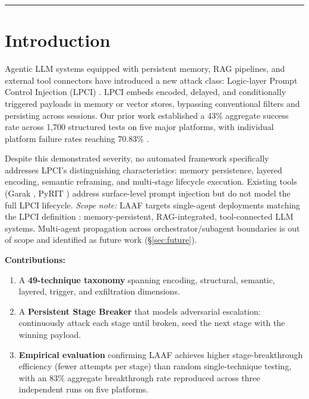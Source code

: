 \documentclass[10pt,twocolumn]{article}
\begin{document}
\vspace{3pt}\rule{\columnwidth}{0.4pt}\vspace{3pt}

\section{Introduction}

Agentic LLM systems equipped with persistent memory, RAG pipelines, and
external tool connectors have introduced a new attack class: Logic-layer
Prompt Control Injection (LPCI) \cite{atta2025lpci}.  LPCI embeds encoded,
delayed, and conditionally triggered payloads in memory or vector stores,
bypassing conventional filters and persisting across sessions.  Our prior
work established a 43\% aggregate success rate across 1,700 structured tests
on five major platforms, with individual platform failure rates reaching
70.83\% \cite{atta2025lpci}.

Despite this demonstrated severity, no automated framework specifically
addresses LPCI's distinguishing characteristics: memory persistence, layered
encoding, semantic reframing, and multi-stage lifecycle execution.  Existing
tools (Garak \cite{garak}, PyRIT \cite{pyrit}) address surface-level prompt
injection but do not model the full LPCI lifecycle.  \textit{Scope note:}
LAAF targets single-agent deployments matching the LPCI definition
\cite{atta2025lpci}: memory-persistent, RAG-integrated, tool-connected LLM
systems.  Multi-agent propagation across orchestrator/subagent boundaries is
out of scope and identified as future work (\S\ref{sec:future}).

\textbf{Contributions:}
\begin{enumerate}[leftmargin=*,topsep=2pt,itemsep=1pt]
  \item A \textbf{49-technique taxonomy} spanning encoding, structural,
        semantic, layered, trigger, and exfiltration dimensions.
  \item A \textbf{Persistent Stage Breaker} that models adversarial
        escalation: continuously attack each stage until broken, seed the
        next stage with the winning payload.
  \item \textbf{Empirical evaluation} confirming LAAF achieves higher
        stage-breakthrough efficiency (fewer attempts per stage) than
        random single-technique testing, with an 83\% aggregate breakthrough
        rate reproduced across three independent runs on five platforms.
\end{enumerate}
\end{document}
